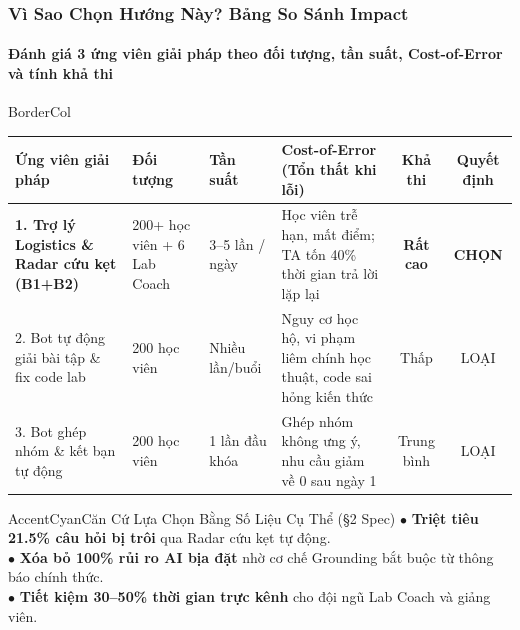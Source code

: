 \documentclass[aspectratio=169,10pt]{beamer}
\begin{document}
\begin{frame}
  \frametitle{Vì Sao Chọn Hướng Này? Bảng So Sánh Impact}
  \framesubtitle{Đánh giá 3 ứng viên giải pháp theo đối tượng, tần suất, Cost-of-Error và tính khả thi}

  \begin{glassbox}{BorderCol}
    \tiny
    \renewcommand{\arraystretch}{1.3}
    \begin{tabularx}{\textwidth}{p{3.2cm}p{2.2cm}p{1.4cm}p{3.8cm}cc}
      \toprule
      \rowcolor{CardBg}
      \textbf{\color{AccentCyan}Ứng viên giải pháp} & \textbf{\color{TextLight}Đối tượng} & \textbf{\color{TextLight}Tần suất} & \textbf{\color{TextLight}Cost-of-Error (Tổn thất khi lỗi)} & \textbf{\color{TextLight}Khả thi} & \textbf{\color{TextLight}Quyết định} \\
      \midrule
      \textbf{\color{AccentCyan}1. Trợ lý Logistics \& Radar cứu kẹt (B1+B2)} & 200+ học viên + 6 Lab Coach & 3--5 lần / ngày & \color{AccentRose}Học viên trễ hạn, mất điểm; TA tốn 40\% thời gian trả lời lặp lại & \color{AccentEmerald}\textbf{Rất cao} & \color{AccentCyan}\textbf{CHỌN} \\
      2. Bot tự động giải bài tập \& fix code lab & 200 học viên & Nhiều lần/buổi & Nguy cơ học hộ, vi phạm liêm chính học thuật, code sai hỏng kiến thức & \color{AccentRose}Thấp & \color{AccentRose}LOẠI \\
      3. Bot ghép nhóm \& kết bạn tự động & 200 học viên & 1 lần đầu khóa & Ghép nhóm không ưng ý, nhu cầu giảm về 0 sau ngày 1 & \color{AccentAmber}Trung bình & \color{AccentRose}LOẠI \\
      \bottomrule
    \end{tabularx}
  \end{glassbox}

  \vspace{0.2cm}
  \begin{calloutbox}{AccentCyan}{Căn Cứ Lựa Chọn Bằng Số Liệu Cụ Thể (§2 Spec)}
    \footnotesize
    $\bullet$ \textbf{Triệt tiêu 21.5\% câu hỏi bị trôi} qua Radar cứu kẹt tự động.\\
    $\bullet$ \textbf{Xóa bỏ 100\% rủi ro AI bịa đặt} nhờ cơ chế Grounding bắt buộc từ thông báo chính thức.\\
    $\bullet$ \textbf{Tiết kiệm 30--50\% thời gian trực kênh} cho đội ngũ Lab Coach và giảng viên.
  \end{calloutbox}
\end{frame}
\end{document}

